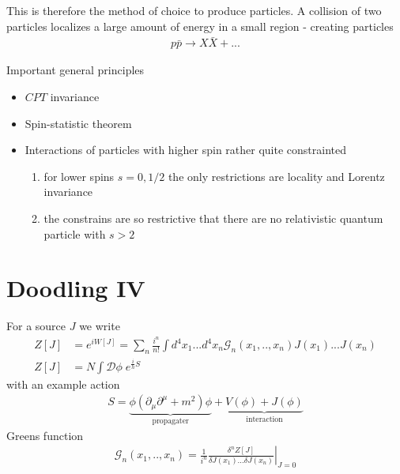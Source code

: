 \documentclass[10pt,a4paper]{book}
\theoremstyle{definition}
\begin{document}
This is therefore the method of choice to produce particles. A collision of two particles localizes a large amount of energy in a small region - creating particles
\begin{align}
    p\bar{p}\rightarrow X\bar{X}+ ...
\end{align}

Important general principles
\begin{itemize}
    \item $CPT$ invariance
    \item Spin-statistic theorem
    \item Interactions of particles with higher spin rather quite constrainted
    \begin{enumerate}
        \item for lower spins $s=0, 1/2$ the only restrictions are locality and Lorentz invariance
        \item the constrains are so restrictive that there are no relativistic quantum particle with $s>2$
    \end{enumerate}
\end{itemize}


\newpage
\chapter{Doodling IV}
For a source $J$ we write
\begin{align}
Z[J]&=e^{iW[J]}=\sum_n\frac{i^n}{n!}\int d^4x_1...d^4x_n\mathcal{G}_n(x_1,..,x_n)J(x_1)...J(x_n)\\
Z[J]&=N\int\mathcal{D}\phi\;e^{\frac{i}{h}S}
\end{align}
with an example action
\begin{align}
S=\underbrace{\phi(\partial_\mu\partial^\mu+m^2)\phi}_\text{propagater}+\underbrace{V(\phi)+J(\phi)}_\text{interaction}
\end{align}
Greens function
\begin{align}
\mathcal{G}_n(x_1,..,x_n)=\left.\frac{1}{i^n}\frac{\delta^n Z[J]}{\delta J(x_1)...\delta J(x_n)}\right|_{J=0}
\end{align}


\newpage
\end{document}
